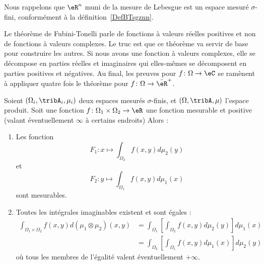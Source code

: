 Nous rappelons que \( \eR^n\) muni de la mesure de Lebesgue est un espace mesuré \( \sigma\)-fini, conformément à la définition~\ref{DefBTsgznn}.

Le théorème de Fubini-Tonelli parle de fonctions à valeurs réelles positives et non de fonctions à valeurs complexes. Le truc est que ce théorème va servir de base pour construire les autres. Si nous avons une fonction à valeurs complexes, elle se décompose en parties réelles et imaginaires qui elles-mêmes se décomposent en parties positives et négatives. Au final, les preuves pour \( f\colon \Omega\to \eC\) se ramènent à appliquer quatre fois le théorème pour \( f\colon \Omega\to \bar \eR^+\).
\begin{theorem}\label{ThoWTMSthY}
	Soient \( (\Omega_i,\tribA_i,\mu_i)\) deux espaces mesurés \( \sigma\)-finis, et \( (\Omega,\tribA,\mu)\) l'espace produit. Soit une fonction \( f\colon \Omega_1\times \Omega_2\to \eR\) une fonction mesurable et positive (valant éventuellement \( \infty\) à certains endroits)
	Alors :
	\begin{enumerate}
		\item       \label{ITEMooUTMNooVIBdpP}
		      Les fonction
		      \begin{equation}        \label{EQooWLADooQwNhEy}
			      F_1\colon x\mapsto \int_{\Omega_2}f(x,y)d\mu_2(y)
		      \end{equation}
		      et
		      \begin{equation}
			      F_2\colon y\mapsto \int_{\Omega_1}f(x,y)d\mu_1(x)
		      \end{equation}
		      sont mesurables.
		\item   \label{ITEMooFKQUooCoCOLV}
		      Toutes les intégrales imaginables existent et sont égales :
		      \begin{subequations}    \label{EqJRVtOGx}
			      \begin{align}
				      \int_{\Omega_1\times \Omega_2}f(x,y)d(\mu_1\otimes \mu_2)(x,y) & =\int_{\Omega_1}\left[ \int_{\Omega_2}f(x,y)d\mu_2(y) \right]d\mu_1(x) \\
				                                                                     & =\int_{\Omega_2}\left[ \int_{\Omega_1}f(x,y)d\mu_1(x) \right]d\mu_2(y)
			      \end{align}
		      \end{subequations}
		      où tous les membres de l'égalité valent éventuellement \( +\infty\).
	\end{enumerate}
\end{theorem}


